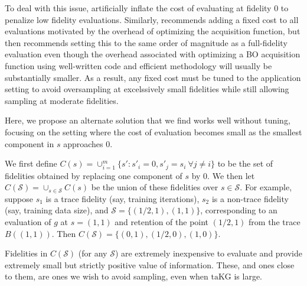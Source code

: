 \documentclass[letterpaper]{article}
\newcommand{\taKG}{\text{taKG}}
\numberwithin{equation}{section}
\newcommand{\pfcomment}[1]{{\color{blue} PF: #1}}
\renewcommand{\S}{\mathcal{S}}
\begin{document}
To deal with this issue, \citet{klein2016fast,mcleod2017practical} artificially inflate the cost of evaluating at fidelity $0$ to penalize low fidelity evaluations.  Similarly, \citet{klein-bayesopt17} recommends adding a fixed cost to all evaluations motivated by the overhead of optimizing the acquisition function, but then recommends setting this to the same order of magnitude as a full-fidelity evaluation even though the overhead associated with optimizing a BO acquisition function using well-written code and efficient methodology will usually be substantially smaller. As a result, any fixed cost must be tuned to the application setting to avoid oversampling at excelssively small fidelities while still allowing sampling at moderate fidelities.

Here, we propose an alternate solution that we find works well without tuning,
focusing on the setting where the cost of evaluation becomes small as the smallest component in $s$ approaches 0.


We first define $C(s) = \cup_{i=1}^m \{ s' : s'_i = 0, s'_j = s_i\ \forall j\ne i \}$
to be the set of fidelities obtained by replacing one component of $s$ by $0$.
We then let $C(\S) = \cup_{s \in \S} C(s)$ be the union of these fidelities over $s \in \S$.
For example, suppose $s_1$ is a trace fidelity (say, training iterations), $s_2$ is a non-trace fidelity (say, training data size), and $\S = \{ (1/2, 1), (1,1) \}$, corresponding to an evaluation of $g$ at $s=(1,1)$ and retention of the point $(1/2,1)$ from the trace $B((1,1))$.
Then $C(\mathcal{S}) = \{ (0,1), (1/2, 0), (1,0) \}$.  %


Fidelities in $C(\S)$ (for any $\S$) are extremely inexpensive to evaluate and provide extremely small but strictly positive value of information.
These, and ones close to them, are ones we wish to avoid sampling, even when $\taKG$ is large.
\end{document}
